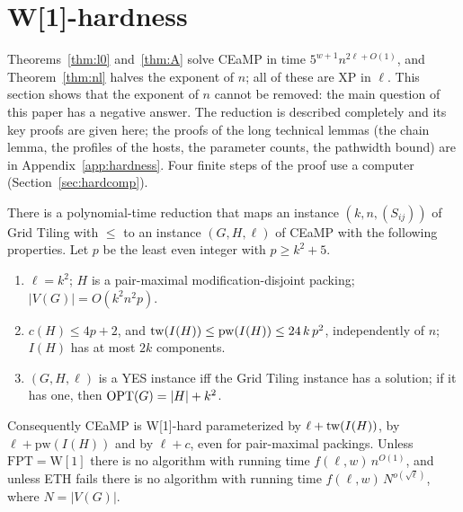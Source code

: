 \section{W[1]-hardness}\label{sec:hardness}
Theorems~\ref{thm:l0} and~\ref{thm:A} solve CEaMP in time $5^{w+1}n^{2\ell+O(1)}$, and Theorem~\ref{thm:nl} halves the exponent of $n$; all of these are XP in $\ell$. This section shows that the exponent of $n$ cannot be removed: the main question of this paper has a negative answer. The reduction is described completely and its key proofs are given here; the proofs of the long technical lemmas (the chain lemma, the profiles of the hosts, the parameter counts, the pathwidth bound) are in Appendix~\ref{app:hardness}. Four finite steps of the proof use a computer (Section~\ref{sec:hardcomp}).
\begin{theorem}[{W[1]}-hardness]\label{thm:hard}
There is a polynomial-time reduction that maps an instance $(k,n,(S_{ij}))$ of Grid Tiling with $\le$ to an instance $(G,H,\ell)$ of CEaMP with the following properties. Let $p$ be the least even integer with $p\ge k^2+5$.
\begin{enumerate}
\item[(i)] $\ell=k^2$; $H$ is a pair-maximal modification-disjoint packing; $|V(G)|=O(k^2n^2p)$.
\item[(ii)] $c(H)\le 4p+2$, and $\mathrm{tw}(I(H))\le\mathrm{pw}(I(H))\le 24\,k\,p^2$, independently of $n$; $I(H)$ has at most $2k$ components.
\item[(iii)] $(G,H,\ell)$ is a YES instance iff the Grid Tiling instance has a solution; if it has one, then $\mathrm{OPT}(G)=|H|+k^2$.
\end{enumerate}
Consequently CEaMP is W[1]-hard parameterized by $\ell+\mathrm{tw}(I(H))$, by $\ell+\mathrm{pw}(I(H))$ and by $\ell+c$, even for pair-maximal packings. Unless $\mathrm{FPT}=\mathrm{W[1]}$ there is no algorithm with running time $f(\ell,w)\,n^{O(1)}$, and unless ETH fails there is no algorithm with running time $f(\ell,w)\,N^{o(\sqrt{\ell})}$, where $N=|V(G)|$.
\end{theorem}



